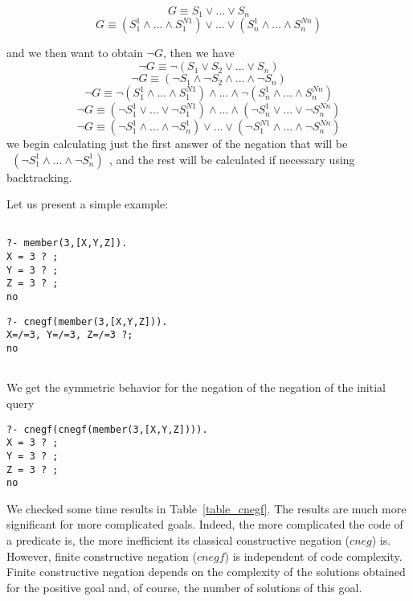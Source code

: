 \documentclass{llncs}
\begin{document}
$$G \equiv S_1 \vee ... \vee S_n $$
$$G \equiv (S_1^1 \wedge...\wedge S_1^{N1}) \vee ... \vee (S_n^1
\wedge...\wedge S_n^{Nn}) $$

\noindent
and we then want to obtain $\neg G$, then we have
$$\neg G \equiv \neg(S_1 \vee S_2 \vee ... \vee S_n) $$
$$\neg G \equiv (\neg S_1 \wedge \neg S_2 \wedge ... \wedge \neg S_n)$$
$$\neg G \equiv \neg(S_1^1 \wedge...\wedge S_1^{N1}) \wedge ... \wedge
\neg (S_n^1 \wedge...\wedge S_n^{Nn}) $$
$$\neg G \equiv (\neg S_1^1 \vee...\vee \neg S_1^{N1}) \wedge
... \wedge ( \neg S_n^1 \vee ...\vee \neg S_n^{Nn}) $$
$$\neg G \equiv (\neg S_1^1 \wedge...\wedge \neg S_n^{1}) \vee
... \vee (\neg S_1^{N1} \wedge...\wedge \neg S_n^{Nn}) $$
\noindent
we begin calculating just the first answer of the negation that will
be $~~(\neg S_1^1 \wedge...\wedge \neg S_n^{1})~~ $, and the rest will
be calculated if necessary using backtracking.

Let us present a simple example:


\begin{minipage}{2in}
\begin{verbatim}

?- member(3,[X,Y,Z]).
X = 3 ? ;
Y = 3 ? ;
Z = 3 ? ;
no

\end{verbatim}
\end{minipage} 
\begin{minipage}{2.5in}
\begin{verbatim} 
?- cnegf(member(3,[X,Y,Z])).
X=/=3, Y=/=3, Z=/=3 ?;
no


\end{verbatim} 
\end{minipage}

\noindent
We get the symmetric behavior for the negation of the
negation of the initial query
\begin{verbatim}
?- cnegf(cnegf(member(3,[X,Y,Z]))).
X = 3 ? ;
Y = 3 ? ;
Z = 3 ? ;
no
\end{verbatim}



We checked some time results in Table~\ref{table_cnegf}. The results
are much more significant for more complicated goals. Indeed, the more
complicated the code of a predicate is, the more inefficient its
classical constructive negation ($cneg$) is. However, finite
constructive negation ($cnegf$) is independent of code
complexity. Finite constructive negation depends on the complexity of
the solutions obtained for the positive goal and, of course, the
number of solutions of this goal.
\end{document}
